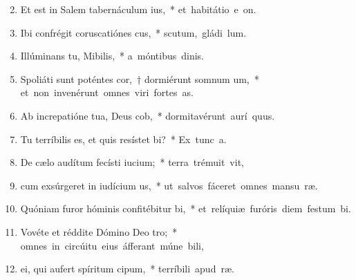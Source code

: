 \begin{flushleft}
\begin{enumerate}[leftmargin=*]
\setcounter{enumi}{1}


\item Et est in Salem tabernáculum ius,~* \mbox{et habitátio e  on.}

\item Ibi confrégit coruscatiónes cus,~* \mbox{scutum, gládi  lum.}

\item Illúminans tu, Mibilis,~* \mbox{a móntibus dinis.}

\item Spoliáti sunt poténtes cor,~† dormiérunt somnum um,~* \mbox{et non invenérunt omnes viri fortes  as.}

\item Ab increpatióne tua, Deus cob,~* \mbox{dormitavérunt aurí  quus.}

\item Tu terríbilis es, et quis resístet bi?~* \mbox{Ex tunc  a.}

\item De cælo audítum fecísti iucium;~* \mbox{terra trémuit  vit,}

\item cum exsúrgeret in iudícium us,~* \mbox{ut salvos fáceret omnes mansu ræ.}

\item Quóniam furor hóminis confitébitur bi,~* \mbox{et relíquiæ furóris diem festum  bi.}

\item Vovéte et réddite Dómino Deo tro;~* \mbox{omnes in circúitu eius áfferant múne bili,}

\item ei, qui aufert spíritum cipum,~* \mbox{terríbili apud  ræ.}


\end{enumerate}
\end{flushleft}

